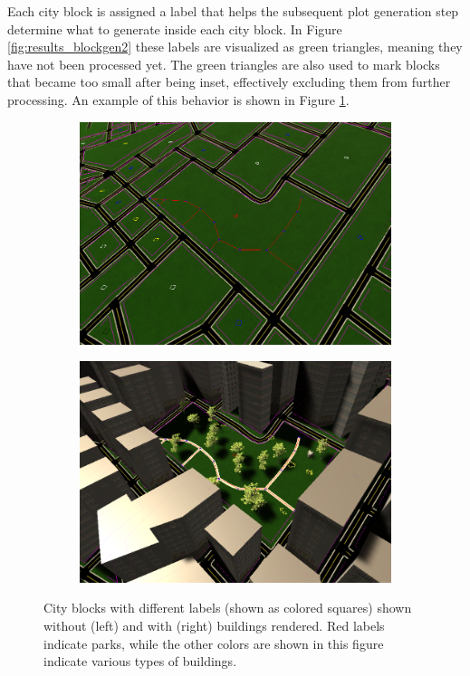 Each city block is assigned a label that helps the subsequent plot generation step determine what to generate inside each city block.
In Figure \ref{fig:results_blockgen2} these labels are visualized as green triangles, meaning they have not been processed yet.
The green triangles are also used to mark blocks that became too small after being inset, effectively excluding them from further processing.
An example of this behavior is shown in Figure \ref{fig:results_blockgen3}.

\begin{figure}[h!]
  \centering
  \begin{subfigure}[b]{0.469\textwidth}
    \includegraphics[width=\textwidth]{figure/results/blockgen3.png}
  \end{subfigure}
  \quad
  \begin{subfigure}[b]{0.471\textwidth}
    \includegraphics[width=\textwidth]{figure/results/blockgen4.png}
  \end{subfigure}

  \caption{City blocks with different labels (shown as colored squares) shown without (left) and with (right) buildings rendered. Red labels indicate parks, while the other colors are shown in this figure indicate various types of buildings.}
  \label{fig:results_blockgen3}
\end{figure}


